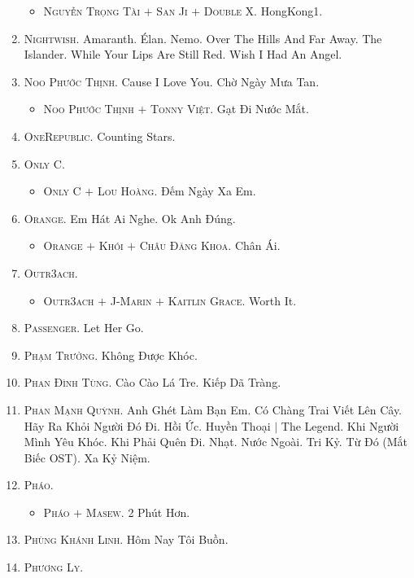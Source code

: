 \documentclass{article}
\numberwithin{equation}{section}
\begin{document}
\begin{enumerate}
\begin{itemize}
		\item \textsc{Nguyễn Trọng Tài $+$ San Ji $+$ Double X.} HongKong1.
	\end{itemize}
	\item \textsc{Nightwish.} Amaranth. \'Elan. Nemo. Over The Hills And Far Away. The Islander. While Your Lips Are Still Red. Wish I Had An Angel.
	\item \textsc{Noo Phước Thịnh.} Cause I Love You. Chờ Ngày Mưa Tan.
	\begin{itemize}
		\item \textsc{Noo Phước Thịnh $+$ Tonny Việt.} Gạt Đi Nước Mắt.
	\end{itemize}
	\item \textsc{OneRepublic.} Counting Stars.
	\item \textsc{Only C.}
	\begin{itemize}
		\item \textsc{Only C $+$ Lou Hoàng.} Đếm Ngày Xa Em.
	\end{itemize}
	\item \textsc{Orange.} Em Hát Ai Nghe. Ok Anh Đúng.
	\begin{itemize}
		\item \textsc{Orange $+$ Khói $+$ Châu Đăng Khoa.} Chân Ái.
	\end{itemize}
	\item \textsc{Outr3ach.}
	\begin{itemize}
		\item \textsc{Outr3ach $+$ J-Marin $+$ Kaitlin Grace.} Worth It.
	\end{itemize}
	\item \textsc{Passenger.} Let Her Go.
	\item \textsc{Phạm Trưởng.} Không Được Khóc.
	\item \textsc{Phan Đình Tùng.} Cào Cào Lá Tre. Kiếp Dã Tràng.
	\item \textsc{Phan Mạnh Quỳnh.} Anh Ghét Làm Bạn Em. Có Chàng Trai Viết Lên Cây. Hãy Ra Khỏi Người Đó Đi. Hồi Ức. Huyền Thoại $|$ The Legend. Khi Người Mình Yêu Khóc. Khi Phải Quên Đi. Nhạt. Nước Ngoài. Tri Kỷ. Từ Đó (Mắt Biếc OST). Xa Kỷ Niệm.
	\item \textsc{Pháo.}
	\begin{itemize}
		\item \textsc{Pháo $+$ Masew.} 2 Phút Hơn.
	\end{itemize}
	\item \textsc{Phùng Khánh Linh.} Hôm Nay Tôi Buồn.
	\item \textsc{Phương Ly.}
	\begin{itemize}

\end{itemize}
\end{enumerate}
\end{document}
